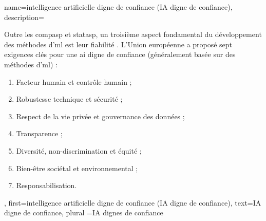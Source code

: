 {
	name={intelligence artificielle digne de confiance (IA digne de confiance)},
	description={Outre les \gls{compasp} et \gls{statasp}, un troisième aspect fondamental 
		du développement des méthodes d'\gls{ml} est leur fiabilité 
		\cite{pfau2024engineeringtrustworthyaideveloper}. 
		L’Union européenne a proposé sept exigences clés pour une \gls{ai} digne de confiance 
		(généralement basée sur des méthodes d'\gls{ml}) \cite{ALTAIEU}: 
		\begin{enumerate}[label=\arabic*)]
			\item Facteur humain et contrôle humain ;
			\item Robustesse technique et sécurité ;
			\item Respect de la vie privée et gouvernance des données ;
			\item Transparence ;
			\item Diversité, non-discrimination et équité ;
			\item Bien-être sociétal et environnemental ;
			\item Responsabilisation. 
		\end{enumerate}
	},
	first={intelligence artificielle digne de confiance (IA digne de confiance)},
	text={IA digne de confiance}, plural ={IA dignes de confiance}
}


